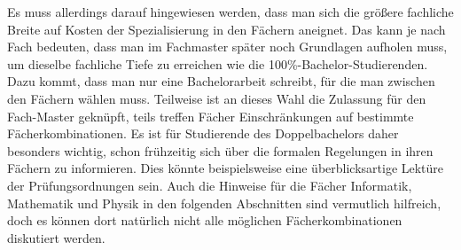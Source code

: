 Es muss allerdings darauf hingewiesen werden, dass man sich die größere fachliche Breite auf Kosten der Spezialisierung in den Fächern aneignet. Das kann je nach Fach bedeuten, dass man im Fachmaster später noch Grundlagen aufholen muss, um dieselbe fachliche Tiefe zu erreichen wie die 100\%-Bachelor-Studierenden. Dazu kommt, dass man nur eine Bachelorarbeit schreibt, für die man zwischen den Fächern wählen muss. Teilweise ist an dieses Wahl die Zulassung für den Fach-Master geknüpft, teils treffen Fächer Einschränkungen auf bestimmte Fächerkombinationen. Es ist für Studierende des Doppelbachelors daher besonders wichtig, schon frühzeitig sich über die formalen Regelungen in ihren Fächern zu informieren. Dies könnte beispielsweise eine überblicksartige Lektüre der Prüfungsordnungen sein. Auch die Hinweise für die Fächer Informatik, Mathematik und Physik in den folgenden Abschnitten sind vermutlich hilfreich, doch es können dort natürlich nicht alle möglichen Fächerkombinationen diskutiert werden.


%
%
%
%
%
%


